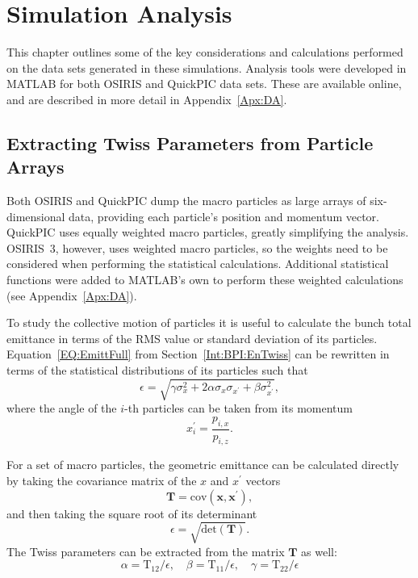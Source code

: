 %
%

\chapter{Simulation Analysis}
\label{Ch:SimA}

This chapter outlines some of the key considerations and calculations performed on the data sets generated in these simulations.
Analysis tools were developed in MATLAB for both OSIRIS and QuickPIC data sets.
These are available online, and are described in more detail in Appendix~\ref{Apx:DA}.

\section{Extracting Twiss Parameters from Particle Arrays}
\label{SimA:EnTwiss}

Both OSIRIS and QuickPIC dump the macro particles as large arrays of six-dimensional data, providing each particle's position and momentum vector.
QuickPIC uses equally weighted macro particles, greatly simplifying the analysis.
OSIRIS~3, however, uses weighted macro particles, so the weights need to be considered when performing the statistical calculations.
Additional statistical functions were added to MATLAB's own to perform these weighted calculations (see Appendix~\ref{Apx:DA}).

To study the collective motion of particles it is useful to calculate the bunch total emittance in terms of the RMS value or standard deviation of its particles.
Equation~\ref{EQ:EmittFull} from Section~\ref{Int:BPI:EnTwiss} can be rewritten in terms of the statistical distributions of its particles such that
\begin{equation}
    \epsilon = \sqrt{\gamma\sigma_{x}^{2} + 2\alpha\sigma_{x}\sigma_{x^{\prime}} + \beta\sigma_{x^{\prime}}^{2}}, \label{EQ:Emitt}
\end{equation}
where the angle of the $i$-th particles can be taken from its momentum
\begin{equation}
    x_{i}^{\prime} = \frac{p_{i,x}}{p_{i,z}}.
\end{equation}

For a set of macro particles, the geometric emittance can be calculated directly by taking the covariance matrix of the $x$ and $x^{\prime}$ vectors
\begin{equation}
    \mathbf{T} = \mathrm{cov}\left(\mathbf{x}, \mathbf{x}^{\prime}\right), \label{EQ:ECalc1}
\end{equation}
and then taking the square root of its determinant
\begin{equation}
    \epsilon = \sqrt{\mathrm{det}\left(\mathbf{T}\right)}. \label{EQ:ECalc2}
\end{equation}
The Twiss parameters can be extracted from the matrix $\mathbf{T}$ as well:
\begin{equation}
    \alpha = \mathrm{T}_{12}/\epsilon, \quad
    \beta  = \mathrm{T}_{11}/\epsilon, \quad
    \gamma = \mathrm{T}_{22}/\epsilon
\end{equation}

